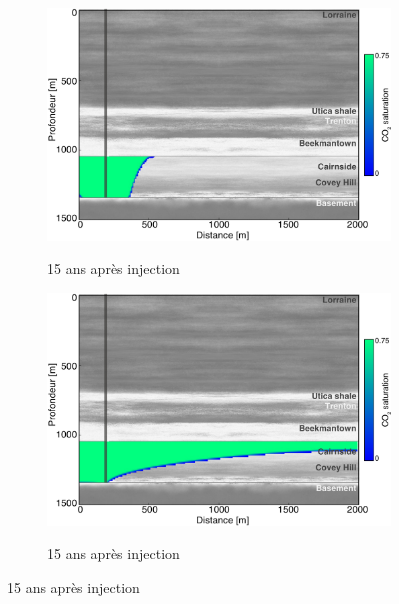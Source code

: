 \begin{figure}[p]
        \begin{subfigure}[b]{.47\textwidth}
                \caption{15 ans après injection }
                \includegraphics[width=\textwidth]{fig/15r.pdf}
                \label{fig:15r}
        \end{subfigure}
        \qquad
        \begin{subfigure}[b]{.47\textwidth}
                \caption{15 ans après injection  }
                \includegraphics[width=\textwidth]{fig/15o.pdf}
                \label{fig:15o}
        \end{subfigure}


\end{figure}
